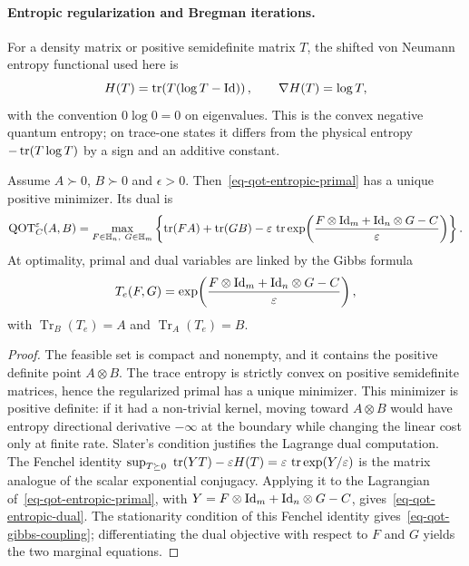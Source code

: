 \paragraph{Entropic regularization and Bregman iterations.}
\begin{defn}\label{def-von-neumann-quantum-entropy}
For a density matrix or positive semidefinite matrix $T$, the shifted von Neumann entropy functional used here is
\[
H(T)=\operatorname{tr}\!\left(T(\log T-\mathrm{Id})\right),
\qquad
\nabla H(T)=\log T,
\]
with the convention $0\log0=0$ on eigenvalues. This is the convex negative quantum entropy; on trace-one states it differs from the physical entropy $-\operatorname{tr}(T\log T)$ by a sign and an additive constant.
\end{defn}
\begin{prop}\label{prop-qot-entropic-duality}
Assume $A\succ0$, $B\succ0$ and $\epsilon>0$. Then~\eqref{eq-qot-entropic-primal} has a unique positive minimizer. Its dual is
\begin{equation}\label{eq-qot-entropic-dual}
\mathrm{QOT}_C^\varepsilon(A,B)
=
\max_{F\in\mathbb H_n,\ G\in\mathbb H_m}
\left\{
\operatorname{tr}(FA)+\operatorname{tr}(GB)
-\varepsilon\,
\operatorname{tr}\exp\!\left(\frac{F\otimes\mathrm{Id}_m+\mathrm{Id}_n\otimes G-C}{\varepsilon}\right)
\right\}.
\end{equation}
At optimality, primal and dual variables are linked by the Gibbs formula
\begin{equation}\label{eq-qot-gibbs-coupling}
T_e(F,G)
=
\exp\!\left(\frac{F\otimes\mathrm{Id}_m+\mathrm{Id}_n\otimes G-C}{\varepsilon}\right),
\end{equation}
with $\operatorname{Tr}_B(T_e)=A$ and $\operatorname{Tr}_A(T_e)=B$.
\end{prop}
\begin{proof}
The feasible set is compact and nonempty, and it contains the positive definite point $A\otimes B$. The trace entropy is strictly convex on positive semidefinite matrices, hence the regularized primal has a unique minimizer. This minimizer is positive definite: if it had a non-trivial kernel, moving toward $A\otimes B$ would have entropy directional derivative $-\infty$ at the boundary while changing the linear cost only at finite rate. Slater's condition justifies the Lagrange dual computation. The Fenchel identity
\(\sup_{T\succeq0}\ \operatorname{tr}(YT)-\varepsilon H(T) = \varepsilon\,\operatorname{tr}\exp(Y/\varepsilon)\)
is the matrix analogue of the scalar exponential conjugacy. Applying it to the Lagrangian of~\eqref{eq-qot-entropic-primal}, with
$Y=F\otimes\mathrm{Id}_m+\mathrm{Id}_n\otimes G-C$, gives~\eqref{eq-qot-entropic-dual}. The stationarity condition of this Fenchel identity gives~\eqref{eq-qot-gibbs-coupling}; differentiating the dual objective with respect to $F$ and $G$ yields the two marginal equations.
\end{proof}
